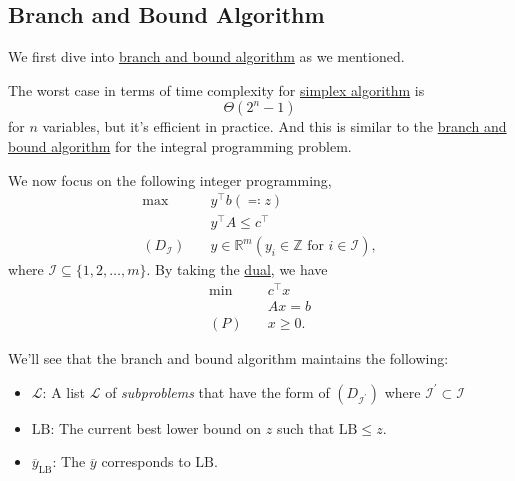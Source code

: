 \subsection{Branch and Bound Algorithm}\label{subsec:branch-and-bound}
We first dive into \hyperref[eg:branch-and-bound]{branch and bound algorithm} as we mentioned.
\begin{prev}
	The worst case in terms of time complexity for \hyperref[algo:simplex-algorithm]{simplex algorithm} is
	\[
		\Theta(2^n - 1)
	\]
	for \(n\) variables, but it's efficient in practice. And this is similar to
	the \hyperref[eg:branch-and-bound]{branch and bound algorithm} for the integral programming problem.
\end{prev}

We now focus on the following integer programming,
\[
	\begin{aligned}
		\max~                   & y^{\top}b(\eqqcolon z)                                              \\
		                        & y^{\top}A\leq c^{\top}                                              \\
		(D_{\mathcal{I} })\quad & y\in\mathbb{R}^m(y_{i}\in\mathbb{Z} \text{ for } i\in \mathcal{I}),
	\end{aligned}
\]
where \(\mathcal{I} \subseteq \{1, 2, \ldots , m\}\). By taking the \hyperref[def:dual]{dual}, we have
\[
	\begin{aligned}
		\min~    & c^{\top}x \\
		         & Ax = b    \\
		(P)\quad & x\geq 0.
	\end{aligned}
\]

We'll see that the branch and bound algorithm maintains the following:
\begin{itemize}
	\item \(\mathcal{L} \): A list \(\mathcal{L} \) of \emph{subproblems} that have the form of \((D_{\mathcal{I^\prime } })\) where \(\mathcal{I} ^\prime \subset \mathcal{I}\)
	\item \(\mathrm{LB} \): The current best lower bound on \(z\) such that \(\mathrm{LB}\leq z \).
	\item \(\overline{y}_{\mathrm{LB}}\): The \(\overline{y}\) corresponds to \(\mathrm{LB}\).
\end{itemize}

